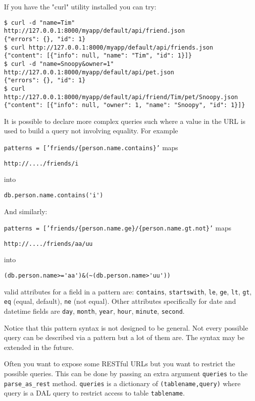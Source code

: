 \documentclass[justified,sixbynine,notoc]{tufte-book}
\def\ft{\small\tt}
\begin{document}
\begin{fullwidth}
If you have the "curl" utility installed you can try:

\begin{lstlisting}
$ curl -d "name=Tim" http://127.0.0.1:8000/myapp/default/api/friend.json
{"errors": {}, "id": 1}
$ curl http://127.0.0.1:8000/myapp/default/api/friends.json
{"content": [{"info": null, "name": "Tim", "id": 1}]}
$ curl -d "name=Snoopy&owner=1" http://127.0.0.1:8000/myapp/default/api/pet.json
{"errors": {}, "id": 1}
$ curl http://127.0.0.1:8000/myapp/default/api/friend/Tim/pet/Snoopy.json
{"content": [{"info": null, "owner": 1, "name": "Snoopy", "id": 1}]}
\end{lstlisting}

It is possible to declare more complex queries such where a value in the URL is used to build a query not involving equality. For example

{\ft patterns = ['friends/\{person.name.contains\}'}
\noindent maps

\begin{lstlisting}[keywords={}]
http://..../friends/i
\end{lstlisting}
\noindent into

\begin{lstlisting}
db.person.name.contains('i')
\end{lstlisting}

And similarly:

{\ft patterns = ['friends/\{person.name.ge\}/\{person.name.gt.not\}'}
\noindent maps

\begin{lstlisting}[keywords={}]
http://..../friends/aa/uu
\end{lstlisting}
\noindent into

\begin{lstlisting}
(db.person.name>='aa')&(~(db.person.name>'uu'))
\end{lstlisting}
\noindent valid attributes for a field in a pattern are: {\ft contains}, {\ft startswith}, {\ft le}, {\ft ge}, {\ft lt}, {\ft gt}, {\ft eq} (equal, default), {\ft ne} (not equal). Other attributes specifically for date and datetime fields are {\ft day}, {\ft month}, {\ft year}, {\ft hour}, {\ft minute}, {\ft second}.

Notice that this pattern syntax is not designed to be general. Not every possible query can be described via a pattern but a lot of them are. The syntax may be extended in the future.

Often you want to expose some RESTful URLs but you want to restrict the possible queries. This can be done by passing an extra argument {\ft queries} to the {\ft parse\_as\_rest} method. {\ft queries} is a dictionary of {\ft (tablename,query)} where query is a DAL query to restrict access to table {\ft tablename}.


\end{fullwidth}
\end{document}

